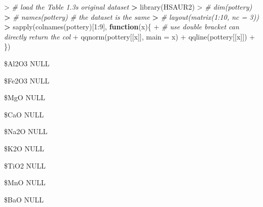 \documentclass[
]{article}
\newenvironment{Shaded}{\begin{snugshade}}{\end{snugshade}}
\newcommand{\AttributeTok}[1]{\textcolor[rgb]{0.77,0.63,0.00}{#1}}
\newcommand{\CommentTok}[1]{\textcolor[rgb]{0.56,0.35,0.01}{\textit{#1}}}
\newcommand{\ControlFlowTok}[1]{\textcolor[rgb]{0.13,0.29,0.53}{\textbf{#1}}}
\newcommand{\DecValTok}[1]{\textcolor[rgb]{0.00,0.00,0.81}{#1}}
\newcommand{\ErrorTok}[1]{\textcolor[rgb]{0.64,0.00,0.00}{\textbf{#1}}}
\newcommand{\FunctionTok}[1]{\textcolor[rgb]{0.00,0.00,0.00}{#1}}
\newcommand{\NormalTok}[1]{#1}
\newcommand{\SpecialCharTok}[1]{\textcolor[rgb]{0.00,0.00,0.00}{#1}}
\begin{document}
\begin{Shaded}
\begin{Highlighting}[]
\SpecialCharTok{\textgreater{}} \CommentTok{\# load the Table 1.3\textquotesingle{}s original dataset }
\ErrorTok{\textgreater{}} \FunctionTok{library}\NormalTok{(HSAUR2)}
\SpecialCharTok{\textgreater{}} \CommentTok{\# dim(pottery)}
\ErrorTok{\textgreater{}} \CommentTok{\# names(pottery) \# the dataset is the same}
\ErrorTok{\textgreater{}} \CommentTok{\# layout(matrix(1:10, nc = 3))}
\ErrorTok{\textgreater{}} \FunctionTok{sapply}\NormalTok{(}\FunctionTok{colnames}\NormalTok{(pottery)[}\DecValTok{1}\SpecialCharTok{:}\DecValTok{9}\NormalTok{], }\ControlFlowTok{function}\NormalTok{(x)\{}
\SpecialCharTok{+}   \CommentTok{\# use double bracket can directly return the col}
\SpecialCharTok{+}   \FunctionTok{qqnorm}\NormalTok{(pottery[[x]], }\AttributeTok{main =}\NormalTok{ x)}
\SpecialCharTok{+}   \FunctionTok{qqline}\NormalTok{(pottery[[x]])}
\SpecialCharTok{+}\NormalTok{ \})}
\end{Highlighting}
\end{Shaded}

\$Al2O3 NULL

\$Fe2O3 NULL

\$MgO NULL

\$CaO NULL

\$Na2O NULL

\$K2O NULL

\$TiO2 NULL

\$MnO NULL

\$BaO NULL
\end{document}
